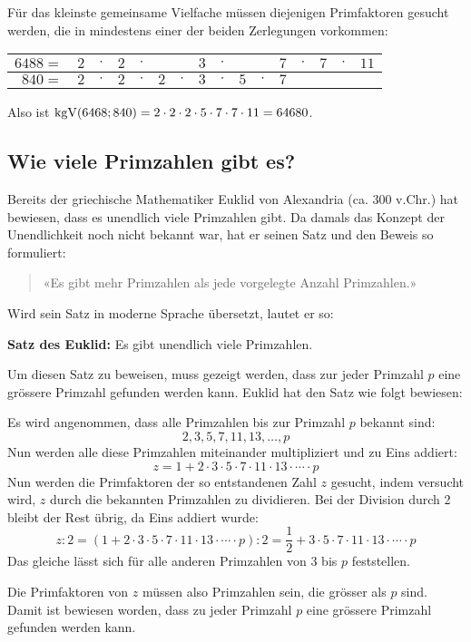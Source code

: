 Für das kleinste gemeinsame Vielfache müssen diejenigen Primfaktoren gesucht werden, die in mindestens einer der beiden Zerlegungen vorkommen:
\begin{center}
  \renewcommand{\arraystretch}{1.3}
  \begin{tabular}{rccccccccccccccc}
    \hline
      $6488=$ & \cellcolor{lightgreen} $2$ & $\cdot$ & \cellcolor{lightgreen} $2$ & $\cdot$ & & & \cellcolor{lightgreen} $3$ & $\cdot$ & & & \cellcolor{lightgreen} $7$ & $\cdot$ & \cellcolor{lightgreen} $7$ & $\cdot$ & \cellcolor{lightgreen} $11$ \\
    \hline
       $840=$ & $2$ & $\cdot$ & $2$ & $\cdot$ & \cellcolor{lightgreen} $2$ & $\cdot$ & $3$ & $\cdot$ & \cellcolor{lightgreen} $5$ & $\cdot$ & $7$ & & & & \\
    \hline
  \end{tabular}
\end{center}
Also ist $\operatorname{kgV}(6468;840) = 2\cdot2\cdot2\cdot5\cdot7\cdot7\cdot11 = 64680$.

\subsection{Wie viele Primzahlen gibt es?}

Bereits der griechische Mathematiker Euklid von Alexandria (ca. 300 v.Chr.) hat bewiesen, dass es unendlich viele Primzahlen gibt. Da damals das Konzept der Unendlichkeit noch nicht bekannt war, hat er seinen Satz und den Beweis so formuliert:
\begin{quote}
  «Es gibt mehr Primzahlen als jede vorgelegte Anzahl Primzahlen.»
\end{quote}
Wird sein Satz in moderne Sprache übersetzt, lautet er so:
\begin{theorem}
  \textbf{Satz des Euklid:} Es gibt unendlich viele Primzahlen.
\end{theorem}

Um diesen Satz zu beweisen, muss gezeigt werden, dass zur jeder Primzahl $p$ eine grössere Primzahl gefunden werden kann. Euklid hat den Satz wie folgt bewiesen:

Es wird angenommen, dass alle Primzahlen bis zur Primzahl $p$ bekannt sind:
\[
  2, 3, 5, 7, 11, 13, \ldots, p
\]
Nun werden alle diese Primzahlen miteinander multipliziert und zu Eins addiert:
\[
  z = 1 + 2\cdot 3\cdot 5\cdot 7\cdot 11\cdot 13\cdot\cdots\cdot p
\]
Nun werden die Primfaktoren der so entstandenen Zahl $z$ gesucht, indem versucht wird, $z$ durch die bekannten Primzahlen zu dividieren. Bei der Division durch 2 bleibt der Rest übrig, da Eins addiert wurde:
\[
  z:2 = (1 + 2\cdot 3\cdot 5\cdot 7\cdot 11\cdot 13\cdot\cdots\cdot p):2 = \frac{1}{2}+ 3\cdot 5\cdot 7\cdot 11\cdot 13\cdot\cdots\cdot p
\]
Das gleiche lässt sich für alle anderen Primzahlen von 3 bis $p$ feststellen.

Die Primfaktoren von $z$ müssen also Primzahlen sein, die grösser als $p$ sind. Damit ist bewiesen worden, dass zu jeder Primzahl $p$ eine grössere Primzahl gefunden werden kann.
